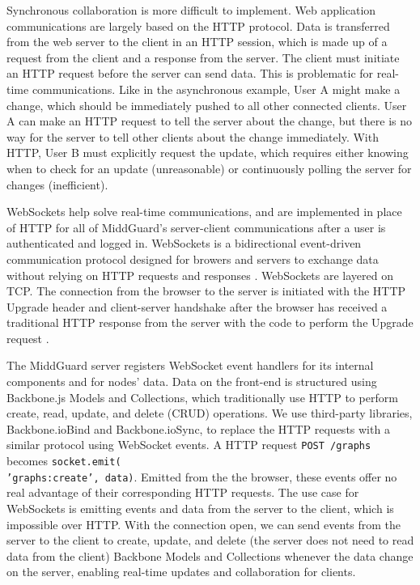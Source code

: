 \documentclass[midd]{thesis}
\begin{document}
Synchronous collaboration is more difficult to implement. Web application
communications are largely based on the HTTP protocol. Data is transferred from
the web server to the client in an HTTP session, which is made up of a request
from the client and a response from the server. The client must initiate an HTTP
request before the server can send data. This is problematic for real-time
communications. Like in the asynchronous example, User A might make a change,
which should be immediately pushed to all other connected clients. User A can
make an HTTP request to tell the server about the change, but there is no way
for the server to tell other clients about the change immediately. With HTTP,
User B must explicitly request the update, which requires either knowing when to
check for an update (unreasonable) or continuously polling the server for
changes (inefficient).

WebSockets help solve real-time communications, and are implemented in place of
HTTP for all of MiddGuard's server-client communications after a user is
authenticated and logged in. WebSockets is a bidirectional event-driven
communication protocol designed for browers and servers to exchange data without
relying on HTTP requests and responses \cite{mdn-websockets}. WebSockets are
layered on TCP. The connection from the browser to the server is initiated with
the HTTP Upgrade header and client-server handshake after the browser has
received a traditional HTTP response from the server with the code to perform
the Upgrade request \cite{RFC6455}.

The MiddGuard server registers WebSocket event handlers for its internal
components and for nodes' data. Data on the front-end is structured using
Backbone.js Models and Collections, which traditionally use HTTP to perform
create, read, update, and delete (CRUD) operations. We use third-party
libraries, Backbone.ioBind and Backbone.ioSync, to replace the HTTP requests
with a similar protocol using WebSocket events. A HTTP request \texttt{POST
/graphs} becomes \texttt{socket.emit(\\'graphs:create', data)}. Emitted from the
the browser, these events offer no real advantage of their corresponding HTTP
requests. The use case for WebSockets is emitting events and data from the
server to the client, which is impossible over HTTP. With the connection open,
we can send events from the server to the client to create, update, and delete
(the server does not need to read data from the client) Backbone Models and
Collections whenever the data change on the server, enabling real-time updates
and collaboration for clients.
\end{document}

